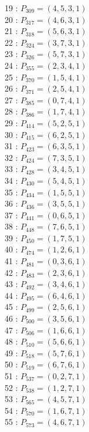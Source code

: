 \documentclass{article}
\begin{document}
{\begin{multicols}{2}
19 : $P_{309}=( 4, 5, 3, 1 )$\\
20 : $P_{317}=( 4, 6, 3, 1 )$\\
21 : $P_{318}=( 5, 6, 3, 1 )$\\
22 : $P_{324}=( 3, 7, 3, 1 )$\\
23 : $P_{326}=( 5, 7, 3, 1 )$\\
24 : $P_{355}=( 2, 3, 4, 1 )$\\
25 : $P_{370}=( 1, 5, 4, 1 )$\\
26 : $P_{371}=( 2, 5, 4, 1 )$\\
27 : $P_{385}=( 0, 7, 4, 1 )$\\
28 : $P_{386}=( 1, 7, 4, 1 )$\\
29 : $P_{414}=( 5, 2, 5, 1 )$\\
30 : $P_{415}=( 6, 2, 5, 1 )$\\
31 : $P_{423}=( 6, 3, 5, 1 )$\\
32 : $P_{424}=( 7, 3, 5, 1 )$\\
33 : $P_{428}=( 3, 4, 5, 1 )$\\
34 : $P_{430}=( 5, 4, 5, 1 )$\\
35 : $P_{434}=( 1, 5, 5, 1 )$\\
36 : $P_{436}=( 3, 5, 5, 1 )$\\
37 : $P_{441}=( 0, 6, 5, 1 )$\\
38 : $P_{448}=( 7, 6, 5, 1 )$\\
39 : $P_{450}=( 1, 7, 5, 1 )$\\
40 : $P_{474}=( 1, 2, 6, 1 )$\\
41 : $P_{481}=( 0, 3, 6, 1 )$\\
42 : $P_{483}=( 2, 3, 6, 1 )$\\
43 : $P_{492}=( 3, 4, 6, 1 )$\\
44 : $P_{495}=( 6, 4, 6, 1 )$\\
45 : $P_{499}=( 2, 5, 6, 1 )$\\
46 : $P_{500}=( 3, 5, 6, 1 )$\\
47 : $P_{506}=( 1, 6, 6, 1 )$\\
48 : $P_{510}=( 5, 6, 6, 1 )$\\
49 : $P_{518}=( 5, 7, 6, 1 )$\\
50 : $P_{519}=( 6, 7, 6, 1 )$\\
51 : $P_{537}=( 0, 2, 7, 1 )$\\
52 : $P_{538}=( 1, 2, 7, 1 )$\\
53 : $P_{565}=( 4, 5, 7, 1 )$\\
54 : $P_{570}=( 1, 6, 7, 1 )$\\
55 : $P_{573}=( 4, 6, 7, 1 )$\\
\end{multicols}
}
\end{document}
